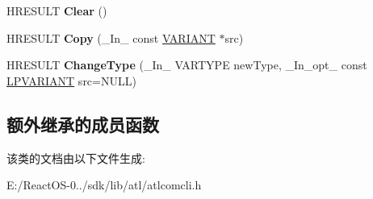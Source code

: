\begin{DoxyCompactItemize}
H\+R\+E\+S\+U\+LT {\bfseries Clear} ()
\item 
\mbox{\label{class_a_t_l_1_1_c_com_variant_af9f82efc696ec4fbde07370de864f449}} 
H\+R\+E\+S\+U\+LT {\bfseries Copy} (\+\_\+\+In\+\_\+ const \hyperlink{structtag_v_a_r_i_a_n_t}{V\+A\+R\+I\+A\+NT} $\ast$src)
\item 
\mbox{\label{class_a_t_l_1_1_c_com_variant_a8fbed7da12405e55dab3fa18aca771d6}} 
H\+R\+E\+S\+U\+LT {\bfseries Change\+Type} (\+\_\+\+In\+\_\+ V\+A\+R\+T\+Y\+PE new\+Type, \+\_\+\+In\+\_\+opt\+\_\+ const \hyperlink{structtag_v_a_r_i_a_n_t}{L\+P\+V\+A\+R\+I\+A\+NT} src=N\+U\+LL)
\end{DoxyCompactItemize}
\subsection*{额外继承的成员函数}


该类的文档由以下文件生成\+:\begin{DoxyCompactItemize}
\item 
E\+:/\+React\+O\+S-\/0../sdk/lib/atl/atlcomcli.\+h\end{DoxyCompactItemize}
